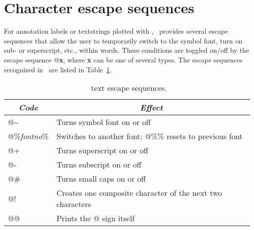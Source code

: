 \section{Character escape sequences}
\label{sec:escape}

For annotation labels or textstrings plotted with ,
\GMT\ provides several escape sequences that allow the user to
temporarily switch to the symbol font, turn on sub- or superscript,
etc., within words.  These conditions are toggled on/off by the
escape sequence @\textbf{x}, where \textbf{x} can be one of several types.
The escape sequences recognized in \GMT\ are listed in Table~\ref{tbl:escape}. 

\begin{table}[H]
\centering
\begin{tabular}{|l|l|} \hline
\multicolumn{1}{|c|}{\emph{Code}}	&	\multicolumn{1}{c|}{\emph{Effect}} \\ \hline
@\~	&	Turns symbol font on or off \\ \hline 
@\%\emph{fontno}\%	&	Switches to another font; @\%\% resets to previous font \\ \hline 
@+	&	Turns superscript on or off \\ \hline 
@-	&	Turns subscript on or off \\ \hline 
@\#	&	Turns small caps on or off \\ \hline 
@!	&	Creates one composite character of the next two characters \\ \hline 
@@	&	Prints the @ sign itself \\ \hline 
\end{tabular}
\caption{\gmt\ text escape sequences.}
\label{tbl:escape}
\end{table}

